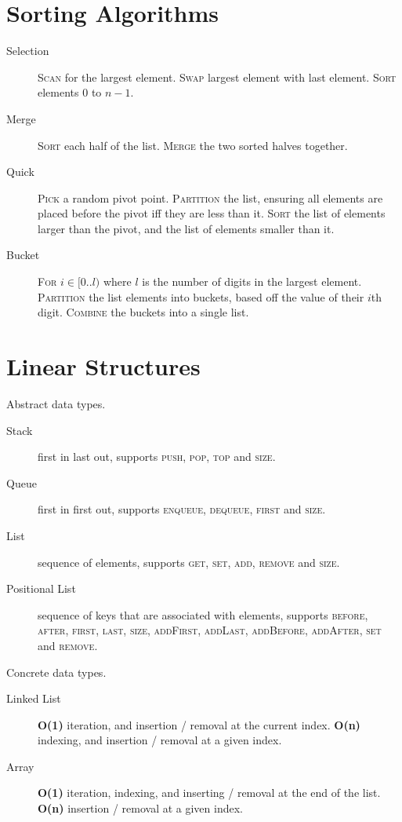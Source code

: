 \documentclass[landscape]{cheat}
\begin{document}
\begin{multicols}{3}
\section{Sorting Algorithms}
\begin{description}
    \item[Selection]
        \textsc{Scan} for the largest element.
        \textsc{Swap} largest element with last element.
        \textsc{Sort} elements 0 to $n-1$.
    \item[Merge]
        \textsc{Sort} each half of the list.
        \textsc{Merge} the two sorted halves together.
    \item[Quick]
        \textsc{Pick} a random pivot point.
        \textsc{Partition} the list, ensuring all elements are placed before the pivot iff they are less than it.
        \textsc{Sort} the list of elements larger than the pivot, and the list of elements smaller than it.
    \item[Bucket]
        \textsc{For} $i \in [0..l)$ where $l$ is the number of digits in the largest element.
        \textsc{Partition} the list elements into buckets, based off the value of their $i$th digit.
        \textsc{Combine} the buckets into a single list.
\end{description}

\section{Linear Structures}
Abstract data types.
\begin{description}
    \item[Stack]
        first in last out,
        supports \textsc{push}, \textsc{pop}, \textsc{top} and \textsc{size}.
    \item[Queue]
        first in first out,
        supports \textsc{enqueue}, \textsc{dequeue}, \textsc{first} and \textsc{size}.
    \item[List]
        sequence of elements,
        supports \textsc{get}, \textsc{set}, \textsc{add}, \textsc{remove} and \textsc{size}.
    \item[Positional List]
        sequence of keys that are associated with elements,
        supports \textsc{before}, \textsc{after}, \textsc{first}, \textsc{last}, \textsc{size},
        \textsc{addFirst}, \textsc{addLast}, \textsc{addBefore}, \textsc{addAfter}, \textsc{set} and \textsc{remove}.
\end{description}
Concrete data types.
\begin{description}
    \item[Linked List]
        \textbf{O(1)} iteration, and insertion / removal at the current index.
        \textbf{O(n)} indexing, and insertion / removal at a given index.
    \item[Array]
        \textbf{O(1)} iteration, indexing, and inserting / removal at the end of the list.
        \textbf{O(n)} insertion / removal at a given index.
\end{description}

\end{multicols}
\end{document}
